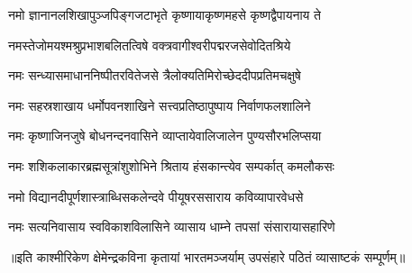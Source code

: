 

\twolineshloka
{नमो ज्ञानानलशिखापुञ्जपिङ्गजटाभृते}
{कृष्णायाकृष्णमहसे कृष्णद्वैपायनाय ते}

\twolineshloka
{नमस्तेजोमयश्मश्रुप्रभाशबलितत्विषे}
{वक्त्रवागीश्वरीपद्मरजसेवोदितश्रिये}

\twolineshloka
{नमः सन्ध्यासमाधाननिष्पीतरवितेजसे}
{त्रैलोक्यतिमिरोच्छेददीपप्रतिमचक्षुषे}

\twolineshloka
{नमः सहस्रशाखाय धर्मोपवनशाखिने}
{सत्त्वप्रतिष्ठापुष्पाय निर्वाणफलशालिने}

\twolineshloka
{नमः कृष्णाजिनजुषे बोधनन्दनवासिने}
{व्याप्तायेवालिजालेन पुण्यसौरभलिप्सया}

\twolineshloka
{नमः शशिकलाकारब्रह्मसूत्रांशुशोभिने}
{श्रिताय हंसकान्त्येव सम्पर्कात् कमलौकसः}

\twolineshloka
{नमो विद्यानदीपूर्णशास्त्राब्धिसकलेन्दवे}
{पीयूषरससाराय कविव्यापारवेधसे}

\twolineshloka
{नमः सत्यनिवासाय स्वविकाशविलासिने}
{व्यासाय धाम्ने तपसां संसारायासहारिणे}

॥इति काश्मीरिकेण क्षेमेन्द्रकविना कृतायां भारतमञ्जर्याम् उपसंहारे पठितं व्यासाष्टकं सम्पूर्णम्॥